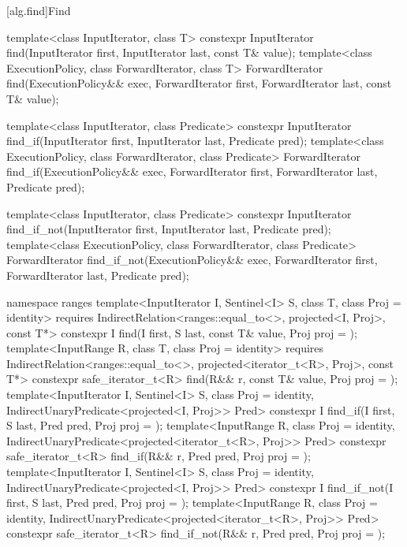 [alg.find]{Find}

%
%
%
\begin{itemdecl}
template<class InputIterator, class T>
  constexpr InputIterator find(InputIterator first, InputIterator last,
                               const T& value);
template<class ExecutionPolicy, class ForwardIterator, class T>
  ForwardIterator find(ExecutionPolicy&& exec, ForwardIterator first, ForwardIterator last,
                       const T& value);

template<class InputIterator, class Predicate>
  constexpr InputIterator find_if(InputIterator first, InputIterator last,
                                  Predicate pred);
template<class ExecutionPolicy, class ForwardIterator, class Predicate>
  ForwardIterator find_if(ExecutionPolicy&& exec, ForwardIterator first, ForwardIterator last,
                          Predicate pred);

template<class InputIterator, class Predicate>
  constexpr InputIterator find_if_not(InputIterator first, InputIterator last,
                                      Predicate pred);
template<class ExecutionPolicy, class ForwardIterator, class Predicate>
  ForwardIterator find_if_not(ExecutionPolicy&& exec,
                              ForwardIterator first, ForwardIterator last,
                              Predicate pred);

namespace ranges {
  template<InputIterator I, Sentinel<I> S, class T, class Proj = identity>
    requires IndirectRelation<ranges::equal_to<>, projected<I, Proj>, const T*>
    constexpr I find(I first, S last, const T& value, Proj proj = {});
  template<InputRange R, class T, class Proj = identity>
    requires IndirectRelation<ranges::equal_to<>, projected<iterator_t<R>, Proj>, const T*>
    constexpr safe_iterator_t<R>
      find(R&& r, const T& value, Proj proj = {});
  template<InputIterator I, Sentinel<I> S, class Proj = identity,
           IndirectUnaryPredicate<projected<I, Proj>> Pred>
    constexpr I find_if(I first, S last, Pred pred, Proj proj = {});
  template<InputRange R, class Proj = identity,
           IndirectUnaryPredicate<projected<iterator_t<R>, Proj>> Pred>
    constexpr safe_iterator_t<R>
      find_if(R&& r, Pred pred, Proj proj = {});
  template<InputIterator I, Sentinel<I> S, class Proj = identity,
           IndirectUnaryPredicate<projected<I, Proj>> Pred>
    constexpr I find_if_not(I first, S last, Pred pred, Proj proj = {});
  template<InputRange R, class Proj = identity,
           IndirectUnaryPredicate<projected<iterator_t<R>, Proj>> Pred>
    constexpr safe_iterator_t<R>
      find_if_not(R&& r, Pred pred, Proj proj = {});
}
\end{itemdecl}

